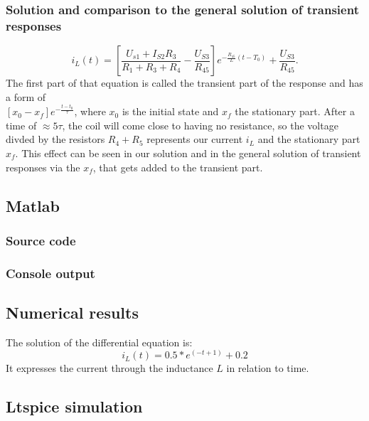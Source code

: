 \documentclass[a4paper]{article}
\begin{document}
\subsubsection{Solution and comparison to the general solution of transient responses}
\[
   i_{L}(t) = \left[ \frac{U_{s1} + I_{S2}R_3}{R_1+R_3+R_4} - \frac{U_{S3}}{R_{45}}
 \right] e^{-\frac{R_{45}}{L} (t-T_0)} + \frac{U_{S3}}{R_{45}}
.\] 
The first part of that equation is called the transient part of the response and has a form of \\
$\left[x_0 - x_f\right] e^{-\frac{t-t_0}{\tau}}$, where $x_0$ is the initial state and $x_f$ the
stationary part. After a time of $\approx5\tau$, the coil will come close to having no resistance, so the
voltage divded by the resistors $R_4+R_5$ represents our current $i_{L}$ and the stationary part
$x_f$. This effect can be seen in our solution and in the general solution of transient responses
via the $x_f$, that gets added to the transient part.   



\clearpage
\subsection{Matlab}
\subsubsection{Source code}

\subsubsection{Console output}
  
\vspace{2mm}

\subsection{Numerical results}
The solution of the differential equation is:
\begin{equation*}
   i_L(t) = 0.5 * e^(-t + 1) + 0.2
\end{equation*}
It expresses the current through the inductance $L$ in relation to time.
\subsection{Ltspice simulation}
\end{document}
